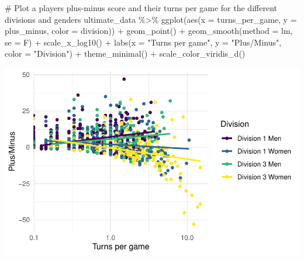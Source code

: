 \documentclass[
  letterpaper,
  DIV=11,
  numbers=noendperiod]{scrartcl}
\newenvironment{Shaded}{\begin{snugshade}}{\end{snugshade}}
\newcommand{\AttributeTok}[1]{\textcolor[rgb]{0.40,0.45,0.13}{#1}}
\newcommand{\CommentTok}[1]{\textcolor[rgb]{0.37,0.37,0.37}{#1}}
\newcommand{\FunctionTok}[1]{\textcolor[rgb]{0.28,0.35,0.67}{#1}}
\newcommand{\NormalTok}[1]{\textcolor[rgb]{0.00,0.23,0.31}{#1}}
\newcommand{\SpecialCharTok}[1]{\textcolor[rgb]{0.37,0.37,0.37}{#1}}
\newcommand{\StringTok}[1]{\textcolor[rgb]{0.13,0.47,0.30}{#1}}
\begin{document}
\begin{Shaded}
\begin{Highlighting}[]
\CommentTok{\# Plot a player\textquotesingle{}s plus{-}minus score and their turns per game for the different divisions and genders}
\NormalTok{ultimate\_data }\SpecialCharTok{\%\textgreater{}\%} \FunctionTok{ggplot}\NormalTok{(}\FunctionTok{aes}\NormalTok{(}\AttributeTok{x =}\NormalTok{ turns\_per\_game, }\AttributeTok{y =}\NormalTok{ plus\_minus, }\AttributeTok{color =}\NormalTok{ division)) }\SpecialCharTok{+} 
   \FunctionTok{geom\_point}\NormalTok{() }\SpecialCharTok{+} \FunctionTok{geom\_smooth}\NormalTok{(}\AttributeTok{method =} \StringTok{\textquotesingle{}lm\textquotesingle{}}\NormalTok{, }\AttributeTok{se =}\NormalTok{ F) }\SpecialCharTok{+} \FunctionTok{scale\_x\_log10}\NormalTok{() }\SpecialCharTok{+}
  \FunctionTok{labs}\NormalTok{(}\AttributeTok{x =} \StringTok{"Turns per game"}\NormalTok{, }\AttributeTok{y =} \StringTok{"Plus/Minus"}\NormalTok{, }\AttributeTok{color =} \StringTok{"Division"}\NormalTok{) }\SpecialCharTok{+} \FunctionTok{theme\_minimal}\NormalTok{() }\SpecialCharTok{+}
  \FunctionTok{scale\_color\_viridis\_d}\NormalTok{()}
\end{Highlighting}
\end{Shaded}

\includegraphics{final_eda_files/figure-pdf/plus-minus-&-other-variable-3.pdf}
\end{document}
